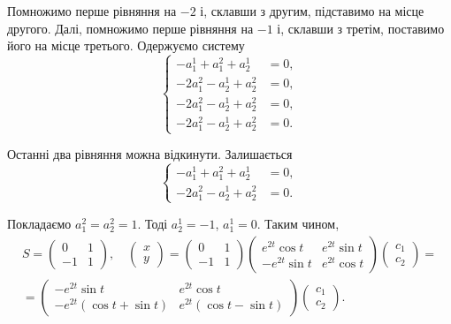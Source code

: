 \begin{solution}
    Помножимо перше рівняння на $-2$ і, склавши з другим, підставимо на місце другого. Далі, помножимо перше рівняння на $-1$ і, склавши з третім, поставимо його на місце третього. Одержуємо систему
    \[ \left\{ \begin{aligned} 
        - a_1^1 + a_1^2 + a_2^1 &= 0, \\
        -2 a_1^2 - a_2^1 + a_2^2 &= 0, \\
        -2 a_1^2 - a_2^1 + a_2^2 &= 0, \\
        -2 a_1^2 - a_2^1 + a_2^2 &= 0.
    \end{aligned} \right.\]
     
    Останні два рівняння можна відкинути. Залишається
    \[ \left\{ \begin{aligned} 
        - a_1^1 + a_1^2 + a_2^1 &= 0, \\
        -2 a_1^2 - a_2^1 + a_2^2 &= 0.
    \end{aligned} \right.\]
    
    Покладаємо $a_1^2 = a_2^2 = 1$. Тоді $a_2^1 = -1$, $a_1^1 = 0$. Таким чином,
    \begin{multline*} S = \begin{pmatrix} 0 & 1 \\ -1 & 1 \end{pmatrix}, \quad \begin{pmatrix} x \\ y \end{pmatrix} = \begin{pmatrix} 0 & 1 \\ -1 & 1 \end{pmatrix} \begin{pmatrix} e^{2 t} \cos t & e^{2 t} \sin t \\ - e^{2 t} \sin t & e^{2 t} \cos t \end{pmatrix} \begin{pmatrix} c_1 \\ c_2 \end{pmatrix} = \\ = \begin{pmatrix} - e^{2 t} \sin t & e^{2 t} \cos t \\ - e^{2 t} (\cos t + \sin t) & e^{2 t} (\cos t - \sin t) \end{pmatrix} \begin{pmatrix} c_1 \\ c_2 \end{pmatrix}. \end{multline*}
\end{solution}

